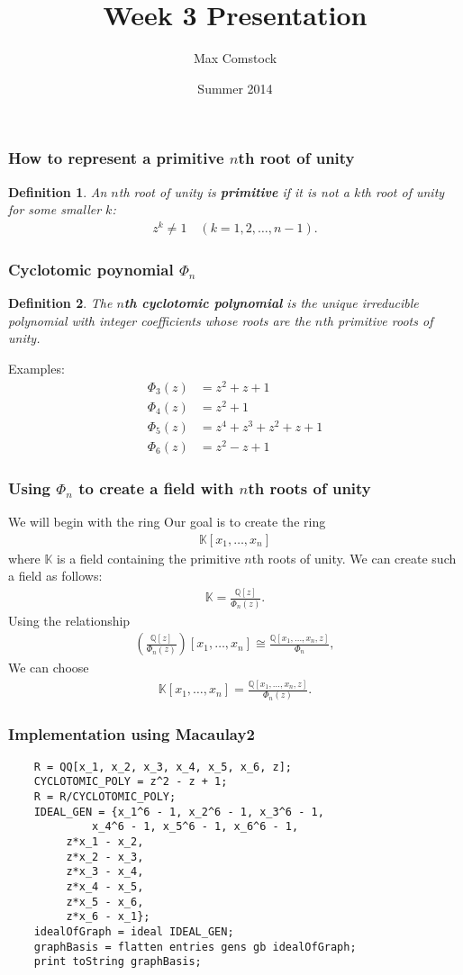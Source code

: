 \documentclass{beamer}
\title{Week 3 Presentation}
\author{Max Comstock}
\date{Summer 2014}
\newtheorem*{defin}{Definition}
\newcommand{\aln}[1]{\begin{align*} #1 \end{align*}} %
\begin{document}
\frame{\titlepage}


\begin{frame}
\frametitle{How to represent a primitive $n$th root of unity}
\begin{defin}
  An $n$th root of unity is \textbf{primitive} if it is not a $k$th root of unity for some smaller $k$:
  \aln{
    z^k \neq 1 \quad (k = 1, 2, \ldots, n-1).
  }
\end{defin}
\end{frame}


\begin{frame}
\frametitle{Cyclotomic poynomial $\Phi_n$}
\begin{defin}
  The \textbf{$n$th cyclotomic polynomial} is the unique irreducible polynomial with integer coefficients whose roots are the $n$th primitive roots of unity.
\end{defin}
Examples:
\aln{
  \Phi_3(z) &= z^2 + z + 1\\
  \Phi_4(z) &= z^2 + 1\\
  \Phi_5(z) &= z^4 + z^3 + z^2 + z + 1\\
  \Phi_6(z) &= z^2 - z + 1
}
\end{frame}


\begin{frame}
\frametitle{Using $\Phi_n$ to create a field with $n$th roots of unity}
We will begin with the ring
Our goal is to create the ring
\aln{
  \mathbb{K}[x_1, \ldots, x_n]
}
where $\mathbb{K}$ is a field containing the primitive $n$th roots of unity. We can create such a field as follows:
\aln{
  \mathbb{K} = \frac{\mathbb{Q}[z]}{\Phi_n(z)}.
}
Using the relationship
\aln{
  \left( \frac{\mathbb{Q}[z]}{\Phi_n(z)} \right)[x_1, \ldots, x_n] \cong \frac{\mathbb{Q}[x_1, \ldots, x_n, z]}{\Phi_n},
}
We can choose
\aln{
  \mathbb{K}[x_1, \ldots, x_n] = \frac{\mathbb{Q}[x_1, \ldots, x_n, z]}{\Phi_n(z)}.
}
\end{frame}


\begin{frame}[fragile]
\frametitle{Implementation using Macaulay2}
\begin{center}
  \begin{verbatim}
    R = QQ[x_1, x_2, x_3, x_4, x_5, x_6, z];
    CYCLOTOMIC_POLY = z^2 - z + 1;
    R = R/CYCLOTOMIC_POLY;
    IDEAL_GEN = {x_1^6 - 1, x_2^6 - 1, x_3^6 - 1,
             x_4^6 - 1, x_5^6 - 1, x_6^6 - 1,
	     z*x_1 - x_2,
	     z*x_2 - x_3,
	     z*x_3 - x_4,
	     z*x_4 - x_5,
	     z*x_5 - x_6,
	     z*x_6 - x_1};
    idealOfGraph = ideal IDEAL_GEN;
    graphBasis = flatten entries gens gb idealOfGraph;
    print toString graphBasis;
  \end{verbatim}
\end{center}
\end{frame}
\end{document}
